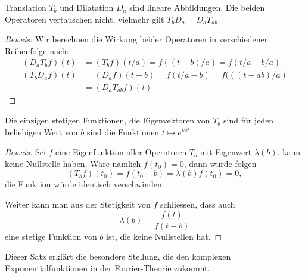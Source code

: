 \begin{satz}
Translation $T_b$ und Dilatation $D_a$ sind lineare Abbildungen.
Die beiden Operatoren vertauschen nicht, vielmehr gilt
$T_bD_a = D_aT_{ab}$.
\end{satz}

\begin{proof}[Beweis]

Wir berechnen die Wirkung beider Operatoren in verschiedener Reihenfolge
nach:
\begin{align*}
(D_aT_bf)(t)
&=
(T_bf)(t/a)
=
f((t-b)/a) = f(t/a - b/a)
\\
(T_bD_a f)(t)
&=
(D_af)(t - b)
=
f(t/a - b)
=
f(((t-ab)/a)
\\
&=
(D_aT_{ab}f)(t)
\end{align*}
\end{proof}


\begin{satz}
Die einzigen stetigen Funktionen, die Eigenvektoren von $T_b$ sind für
jeden beliebigen Wert von $b$ sind die Funktionen $t\mapsto e^{i\omega t}$.
\end{satz}

\begin{proof}[Beweis]
Sei $f$ eine Eigenfunktion aller Operatoren $T_b$ mit Eigenwert $\lambda(b)$.
 kann keine Nullstelle haben.
Wäre nämlich $f(t_0)=0$, dann würde folgen
\[
(T_bf)(t_0) = f(t_0-b) = \lambda(b) f(t_0) = 0,
\]
die Funktion würde identisch verschwinden.

Weiter kann man aus der Stetigkeit von $f$ schliessen, dass auch
\[
\lambda(b) = \frac{f(t)}{f(t-b)}
\]
eine stetige Funktion von $b$ ist, die keine Nullstellen hat.
\end{proof}

Dieser Satz erklärt die besondere Stellung, die den komplexen
Exponentialfunktionen in der Fourier-Theorie zukommt.
